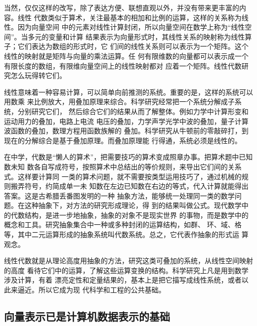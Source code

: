 当然，仅仅这样的改写，除了表达方便、联想直观以外，并没有带来更丰富的内容。线性
代数类似于算术，关注最基本的相加和比例的运算，这样的关系称为线性。因为向量空间
中的元素对线性计算封闭，所以向量空间在数学上称为“线性空间”。当多元的变量和计算
结果表示为向量形式时，其线性关系的映射称为线性算子；它们表达为数组的形式时，它
们间的线性关系则可以表示为一个矩阵。这个线性的映射就是矩阵与向量的乘法运算。任
何有限维数的向量都可以表示成一个有限长度的数组，有限维向量空间上的线性映射都对
应着一个矩阵。线性代数研究怎么玩得转它们。

线性意味着一种容易计算，可以简单向前推测的系统。重要的是，这样的系统可以用数乘
来比例放大，用叠加原理来综合。科学研究经常把一个系统分解成子系统，分别研究它们，
然后综合它们的结果从而了解整体。例如力学中计算形变和运动用力的叠加，电路上电流
电压的叠加，力学声学光学中波的叠加，量子计算波函数的叠加，数理方程用函数族解的
叠加。科学研究从牛顿前的零敲碎打，到现在的分解综合是基于叠加原理。而叠加原理能
行得通，系统必须是线性的。

在中学，代数是“懒人的算术”，把需要技巧的算术变成照章办事。把算术题中已知数未知
数各自写成符号，按照算术中总结出的等价规则，来导出它们间的关系式。这样要计算同
一类的算术问题，就不需要按类型运用技巧了，通过机械的规则搬弄符号，约简成单一未
知数在左边已知数在右边的等式，代入计算就能得出答案。这是古希腊丢番图发明的一种
抽象方法，能够统一处理同一类的数学问题。在这种抽象下，对方法的研究形成理论，得
到的结果叫做公式。现代数学中的代数结构，是进一步地抽象，抽象的对象不是现实世界
的事物，而是数学中的概念和工具。研究抽象集合中一种或多种封闭的运算结构，如群、
环、域、格等，其中二元运算形成的抽象系统叫代数系统。总之，它代表作抽象的形式运
算观念。

线性代数就是从理论高度用抽象的方法，研究这类可叠加的系统，从线性空间映射的高度
看待它们中的运算，了解这些运算变换的结构。科学研究上凡是用到数学涉及计算，有着
漂亮定性和定量结果的，基本上是把它描写成线性系统，或者以此来逼近。所以它成为现
代科学和工程的公共基础。

\subsection{向量表示已是计算机数据表示的基础}

